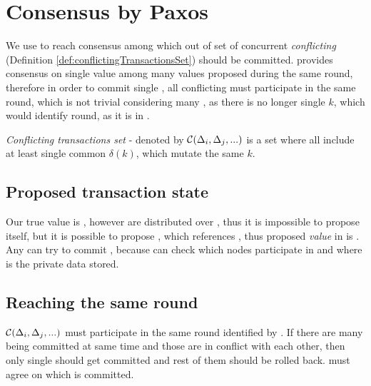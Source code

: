 
\section{Consensus by Paxos}
We use \paxos to reach consensus among \nodesTx which \transaction out of set of concurrent \emph{conflicting} \transactions (Definition \ref{def:conflictingTransactionsSet}) should be committed. \paxos provides consensus on single value among many values proposed during the same \paxos round, therefore in order to commit single \transaction, all conflicting \transactions must participate in the same \paxos round, which is not trivial considering many \mutationsFull, as there is no longer single $k$, which would identify \paxos round, as it is in \lwt.

\begin{definition}
\label{def:conflictingTransactionsSet}
\emph{Conflicting transactions set} - denoted by $\mathcal{C}\text{$(\Delta_{i}, \Delta_{j}, ...)$}$ is a set where all \transactions include at least single common $\delta(k)$, which mutate the same $k$.
\end{definition}

\subsection{Proposed transaction state}
Our true value is \transactionFull, however \mutationsFull are distributed over \nodesOfMutations, thus it is impossible to propose \transaction itself, but it is possible to propose \txState, which references \mutations, thus proposed \paxos \emph{value} in \mpt is \txState. Any  can try to commit \transaction, because  can check which nodes participate in \transaction and where is the private data stored. 



\subsection{Reaching the same \paxos round}
$\mathcal{C}\text{$(\Delta_{i}, \Delta_{j}, ...)$}$ must participate in the same \paxos round identified by \paxosRoundId.
If there are many \transactions being committed at same time and those \transactions are in conflict with each other, then only single \transaction should get committed and rest of them should be rolled back. \nodesTx must agree on which \transaction is committed.

